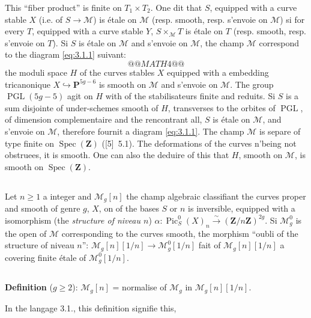 \documentclass[12pt,a4paper]{article}
\theoremstyle{plain}
\theoremstyle{definition}
\theoremstyle{remark}
\DeclareMathOperator{\Pic}{Pic}
\DeclareMathOperator{\Spec}{Spec}
\DeclareMathOperator{\PGL}{PGL}
\begin{document}
This ``fiber product'' is finite on $T_1 \times T_2$. One dit that $S$, equipped with a curve stable $X$ (i.e. of $S \to \mathcal{M}$) is étale on $\mathcal{M}$ (resp. smooth, resp. s'envoie on $\mathcal{M}$) si for every $T$, equipped with a curve stable $Y$, $S \times_{\mathcal{M}} T$ is étale on $T$ (resp. smooth, resp. s'envoie on $T$). Si $S$ is étale on $\mathcal{M}$ and s'envoie on $\mathcal{M}$, the champ $\mathcal{M}$ correspond to the diagram \eqref{eq:3.1.1} suivant:
\[
@@MATH4@@
\]
the moduli space $H$ of the curves stables $X$ equipped with a embedding tricanonique $X \hookrightarrow \mathbf{P}^{5g-6}$ is smooth on $\mathcal{M}$ and s'envoie on $\mathcal{M}$. The group $\PGL(5g-5)$ agit on $H$ with of the stabilisateurs finite and reduits. Si $S$ is a sum disjointe of under-schemes smooth of $H$, transverses to the orbites of $\PGL$, of dimension complementaire and the rencontrant all, $S$ is étale on $\mathcal{M}$, and s'envoie on $\mathcal{M}$, therefore fournit a diagram \eqref{eq:3.1.1}. The champ $\mathcal{M}$ is separe of type finite on $\Spec(\mathbf{Z})$ ([5]~5.1). The deformations of the curves n'being not obstruees, it is smooth. One can also the deduire of this that $H$, smooth on $\mathcal{M}$, is smooth on $\Spec(\mathbf{Z})$.

\subsection{} Let $n \geq 1$ a integer and $\mathcal{M}_g[n]$ the champ algebraic classifiant the curves proper and smooth of genre $g$, $X$, on of the bases $S$ or $n$ is inversible, equipped with a isomorphism (the \emph{structure of niveau $n$}) $\alpha : \Pic_S^0(X)_n \xrightarrow{\sim} (\mathbf{Z}/n\mathbf{Z})^{2g}$. Si $\mathcal{M}_g^0$ is the open of $\mathcal{M}$ corresponding to the curves smooth, the morphism ``oubli of the structure of niveau $n$'': $\mathcal{M}_g[n][1/n] \to \mathcal{M}_g^0[1/n]$ fait of $\mathcal{M}_g[n][1/n]$ a covering finite étale of $\mathcal{M}_g^0[1/n]$.

\subsection{}\label{sec:3.4}

\textbf{Definition} ($g \geq 2$): $\mathcal{M}_g[n]$ = normalise of $\mathcal{M}_g$ in $\mathcal{M}_g[n][1/n]$.

In the langage 3.1., this definition signifie this,
\end{document}

